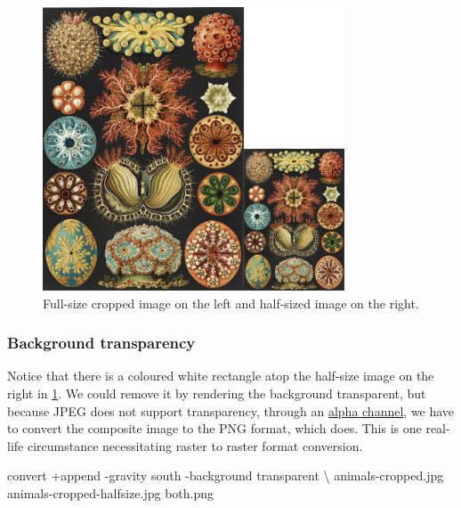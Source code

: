 \documentclass[
  11pt,
  british,
  a4paper,
]{article}
\newenvironment{Shaded}{\begin{snugshade}}{\end{snugshade}}
\newcommand{\AttributeTok}[1]{\textcolor[rgb]{0.80,0.80,0.80}{#1}}
\newcommand{\DataTypeTok}[1]{\textcolor[rgb]{0.87,0.87,0.75}{#1}}
\newcommand{\ExtensionTok}[1]{\textcolor[rgb]{0.80,0.80,0.80}{#1}}
\newcommand{\NormalTok}[1]{\textcolor[rgb]{0.80,0.80,0.80}{#1}}
\begin{document}
\begin{figure}
\hypertarget{fig:both-jpg}{%
\centering
\includegraphics[width=0.8\textwidth,height=\textheight]{images/both.jpg}
\caption{Full-size cropped image on the left and half-sized image on the
right.}\label{fig:both-jpg}
}
\end{figure}

\hypertarget{background-transparency}{%
\subsubsection{Background transparency}\label{background-transparency}}

Notice that there is a coloured white rectangle atop the half-size image
on the right in \cref{fig:both-jpg}. We could remove it by rendering the
background transparent, but because JPEG does not support transparency,
through an
\href{https://www.techopedia.com/definition/1945/alpha-channel}{alpha
channel}, we have to convert the composite image to the PNG format,
which does. This is one real-life circumstance necessitating raster to
raster format conversion.

\begin{Shaded}
\begin{Highlighting}[]
\ExtensionTok{convert}\NormalTok{ +append }\AttributeTok{{-}gravity}\NormalTok{ south }\AttributeTok{{-}background}\NormalTok{ transparent }\DataTypeTok{\textbackslash{}}
\NormalTok{animals{-}cropped.jpg animals{-}cropped{-}halfsize.jpg both.png}
\end{Highlighting}
\end{Shaded}
\end{document}
